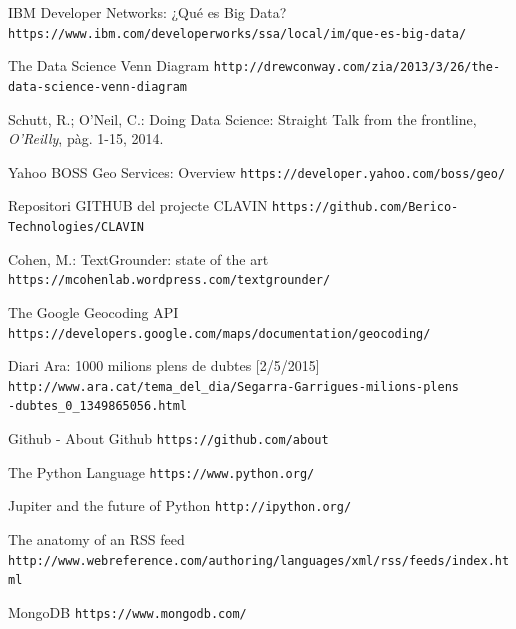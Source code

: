 \documentclass[12pt,a4paper,openright,oneside]{article}
\numberwithin{equation}{section}
\theoremstyle{definition}
\begin{document}
\begin{thebibliography}{50}
 IBM Developer Networks: ¿Qué es Big Data?
\newline \texttt{https://www.ibm.com/developerworks/ssa/local/im/que-es-big-data/}

 The Data Science Venn Diagram
\newline \texttt{http://drewconway.com/zia/2013/3/26/the-data-science-venn-diagram}

 Schutt, R.; O'Neil, C.: Doing Data Science: Straight Talk from the frontline, \textit{O'Reilly}, pàg. 1-15, 2014.

 Yahoo BOSS Geo Services: Overview
\newline \texttt{https://developer.yahoo.com/boss/geo/}

 Repositori GITHUB del projecte CLAVIN
\newline \texttt{https://github.com/Berico-Technologies/CLAVIN}

 Cohen, M.: TextGrounder: state of the art
\newline \texttt{https://mcohenlab.wordpress.com/textgrounder/}

 The Google Geocoding API
\newline \texttt{https://developers.google.com/maps/documentation/geocoding/}

 Diari Ara: 1000 milions plens de dubtes [2/5/2015]
\newline \texttt{http://www.ara.cat/tema\_del\_dia/Segarra-Garrigues-milions-plens\\-dubtes\_0\_1349865056.html}

 Github - About Github
\newline \texttt{https://github.com/about}

 The Python Language
\newline \texttt{https://www.python.org/}

 Jupiter and the future of Python
\newline \texttt{http://ipython.org/}

 The anatomy of an RSS feed
\newline \texttt{http://www.webreference.com/authoring/languages/xml/rss/feeds/index.html}

 MongoDB
\newline \texttt{https://www.mongodb.com/}


\end{thebibliography}
\end{document}

